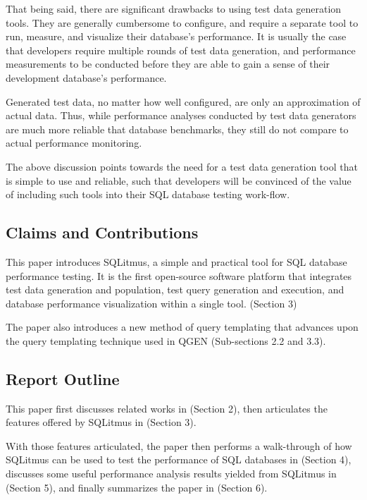 \documentclass[12pt]{article}
\begin{document}
\begin{spacing}{1.9}
		That being said, there are significant drawbacks to using test data generation tools. They are generally cumbersome to configure, and require a separate tool to run, measure, and visualize their database’s performance. It is usually the case that developers require multiple rounds of test data generation, and performance measurements to be conducted before they are able to gain a sense of their development database’s performance. 
		
		Generated test data, no matter how well configured, are only an approximation of actual data. Thus, while performance analyses conducted by test data generators are much more reliable that database benchmarks, they still do not compare to actual performance monitoring.
		
		The above discussion points towards the need for a test data generation tool that is simple to use and reliable, such that developers will be convinced of the value of including such tools into their SQL database testing work-flow.
		
		
		
		
		\subsection{Claims and Contributions}
		This paper introduces SQLitmus, a simple and practical tool for SQL database performance testing. It is the first open-source software platform that integrates test data generation and population, test query generation and execution, and database performance visualization within a single tool. (Section 3)
		
		The paper also introduces a new method of query templating that advances upon the query templating technique used in QGEN\cite{Poess:2004} (Sub-sections 2.2 and 3.3).
		
		
		\subsection{Report Outline}
		
		This paper first discusses related works in (Section 2), then articulates the features offered by SQLitmus in (Section 3).
		
		With those features articulated, the paper then performs a walk-through of how SQLitmus can be used to test the performance of SQL databases in (Section 4), discusses some useful performance analysis results yielded from SQLitmus in (Section 5), and finally summarizes the paper in (Section 6).
		

\end{spacing}
\end{document}
